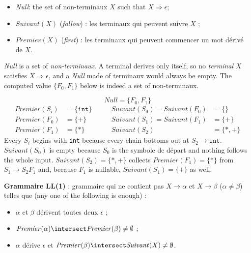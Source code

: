 \begin{definition}
  \leavevmode
  \begin{itemize}
    \item \textit{Null}: the set of non-terminaux $X$ such that
      $X \Rightarrow \epsilon$;
    \item $\mathit{Suivant}(X)$ (\textit{follow}) : les terminaux qui peuvent
      suivre $X$ ;
    \item $\mathit{Premier}(X)$ (\textit{first}) : les terminaux qui peuvent
      commencer un mot dérivé de $X$.
  \end{itemize}
\end{definition}

\begin{remark}
  \textit{Null} is a set of \emph{non-terminaux}. A terminal derives only
  itself, so no \emph{terminal} $X$ satisfies $X \Rightarrow \epsilon$, and a
  \textit{Null} made of terminaux would always be empty. The computed value
  $\{F_{0},F_{1}\}$ below is indeed a set of non-terminaux.
\end{remark}

\begin{example}
  \[
    \mathit{Null} = \{F_{0}, F_{1}\}
  \]
  \[
    \begin{aligned}
      \mathit{Premier}(S_{i}) &= \{\texttt{int}\} & \qquad
      \mathit{Suivant}(S_{0}) = \mathit{Suivant}(F_{0}) &= \{\} \\
      \mathit{Premier}(F_{0}) &= \{+\}            & \qquad
      \mathit{Suivant}(S_{1}) = \mathit{Suivant}(F_{1}) &= \{+\} \\
      \mathit{Premier}(F_{1}) &= \{*\}            & \qquad
      \mathit{Suivant}(S_{2}) &= \{*, +\}
    \end{aligned}
  \]
  Every $S_{i}$ begins with \verb|int| because every chain bottoms out at
  $S_{2} \to \texttt{int}$. $\mathit{Suivant}(S_{0})$ is empty because $S_{0}$
  is the symbole de départ and nothing follows the whole input.
  $\mathit{Suivant}(S_{2}) = \{*,+\}$ collects $\mathit{Premier}(F_{1}) = \{*\}$
  from $S_{1} \to S_{2}F_{1}$ and, because $F_{1}$ is nullable,
  $\mathit{Suivant}(S_{1}) = \{+\}$ as well.
\end{example}

\begin{definition}[Grammaire LL(1)]
  \textbf{Grammaire LL(1)} : grammaire qui ne contient pas $X \to \alpha$ et
  $X \to \beta$ ($\alpha \neq \beta$) telles que (any one of the following is
  enough) :
  \begin{itemize}
    \item $\alpha$ et $\beta$ dérivent toutes deux $\epsilon$ ;
    \item $\mathit{Premier}(\alpha) \intersect \mathit{Premier}(\beta) \neq \emptyset$ ;
    \item $\alpha$ dérive $\epsilon$ et
      $\mathit{Premier}(\beta) \intersect \mathit{Suivant}(X) \neq \emptyset$.
  \end{itemize}
\end{definition}

